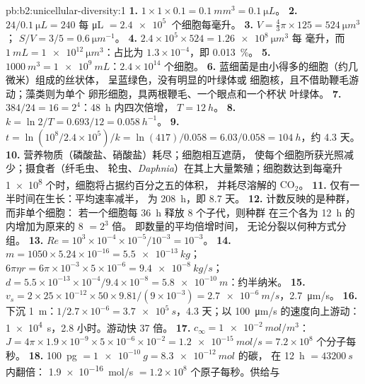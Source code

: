 \begin{solution}{pb:b2:unicellular-diversity:1}
\textbf{1.} $1\times 1\times 0.1 = \qty{0.1}{mm^3} = \qty{0.1}{\micro L}$。
\textbf{2.} $24/\qty{0.1}{\micro L} = 240$ 每 \unit{\micro L} $=
\qty{2.4e5}{}$ 个细胞每毫升。
\textbf{3.} $V = \tfrac{4}{3}\pi\times 125 = \qty{524}{\micro m^3}$；
$S/V = 3/5 = \qty{0.6}{\micro m^{-1}}$。
\textbf{4.} $2.4\times 10^5\times 524 = \qty{1.26e8}{\micro m^3}$ 每
毫升，而 $\qty{1}{mL} = \qty{1e12}{\micro m^3}$：占比为
$1.3\times 10^{-4}$，即 \qty{0.013}{\%}。
\textbf{5.} $\qty{1000}{m^3} = \qty{1e9}{mL}$：$2.4\times 10^{14}$
个细胞。
\textbf{6.} 蓝细菌是由小得多的细胞（约几微米）组成的丝状体，
呈蓝绿色，没有明显的叶绿体或
细胞核，且不借助鞭毛游动；藻类则为单个
卵形细胞，具两根鞭毛、一个眼点和一个杯状
叶绿体。
\textbf{7.} $384/24 = 16 = 2^4$：\qty{48}{h} 内四次倍增，
$T = \qty{12}{h}$。
\textbf{8.} $k = \ln 2/T = 0.693/12 = \qty{0.058}{h^{-1}}$。
\textbf{9.} $t = \ln(10^8/2.4\times 10^5)/k = \ln(417)/0.058 =
6.03/0.058 = \qty{104}{h}$，约 4.3 天。
\textbf{10.} 营养物质（磷酸盐、硝酸盐）耗尽；细胞相互遮荫，
使每个细胞所获光照减少；摄食者（纤毛虫、
轮虫、\emph{Daphnia}）在其上大量繁殖；细胞数达到每毫升 \qty{1e8}{}
个时，细胞将占据约百分之五的体积，
并耗尽溶解的 $\mathrm{CO_2}$。
\textbf{11.} 仅有一半时间在生长：平均速率减半，
为 \qty{208}{h}，即 8.7 天。
\textbf{12.} 计数反映的是种群，而非单个细胞：
若一个细胞每 \qty{36}{h} 释放 8 个子代，则种群
在三个各为 \qty{12}{h} 的内增加为原来的 8 $= 2^3$ 倍。
即数量的平均倍增时间，
无论分裂以何种方式分组。
\textbf{13.} $Re = 10^3\times 10^{-4}\times 10^{-5}/10^{-3} = 10^{-3}$。
\textbf{14.} $m = 1050\times 5.24\times 10^{-16} = \qty{5.5e-13}{kg}$；
$6\pi\eta r = 6\pi\times 10^{-3}\times 5\times 10^{-6} =
\qty{9.4e-8}{kg/s}$；$d = 5.5\times 10^{-13}\times 10^{-4}/9.4\times
10^{-8} = \qty{5.8e-10}{m}$：约半纳米。
\textbf{15.} $v_s = 2\times 25\times 10^{-12}\times 50\times
9.81/(9\times 10^{-3}) = \qty{2.7e-6}{m/s}$，\qty{2.7}{\micro m/s}。
\textbf{16.} 下沉 \qty{1}{m}：$1/2.7\times 10^{-6} =
\qty{3.7e5}{s}$，4.3 天；以 \qty{100}{\micro m/s} 的速度向上游动：
\qty{1e4}{s}，2.8 小时。游动快 37 倍。
\textbf{17.} $c_\infty = \qty{1e-2}{mol/m^3}$：$J = 4\pi\times
1.9\times 10^{-9}\times 5\times 10^{-6}\times 10^{-2} =
\qty{1.2e-15}{mol/s} = 7.2\times 10^8$ 个分子每秒。
\textbf{18.} \qty{100}{pg} $= \qty{1e-10}{g} = \qty{8.3e-12}{mol}$ 的碳，
在 \qty{12}{h} $= \qty{43200}{s}$ 内翻倍：
\qty{1.9e-16}{mol/s} $= 1.2\times 10^8$ 个原子每秒。供给与

\end{solution}
